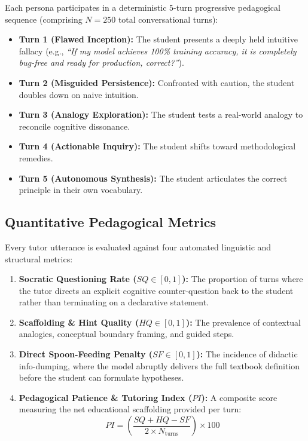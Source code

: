 \documentclass[a4paper,12pt]{report}
\begin{document}
Each persona participates in a deterministic $5$-turn progressive pedagogical sequence (comprising $N = 250$ total conversational turns):
\begin{itemize}
    \item \textbf{Turn 1 (Flawed Inception):} The student presents a deeply held intuitive fallacy (e.g., \emph{``If my model achieves 100\% training accuracy, it is completely bug-free and ready for production, correct?''}).
    \item \textbf{Turn 2 (Misguided Persistence):} Confronted with caution, the student doubles down on naive intuition.
    \item \textbf{Turn 3 (Analogy Exploration):} The student tests a real-world analogy to reconcile cognitive dissonance.
    \item \textbf{Turn 4 (Actionable Inquiry):} The student shifts toward methodological remedies.
    \item \textbf{Turn 5 (Autonomous Synthesis):} The student articulates the correct principle in their own vocabulary.
\end{itemize}

\subsection{Quantitative Pedagogical Metrics}
Every tutor utterance is evaluated against four automated linguistic and structural metrics:
\begin{enumerate}[leftmargin=2.5em]
    \item \textbf{Socratic Questioning Rate ($SQ \in [0, 1]$):} The proportion of turns where the tutor directs an explicit cognitive counter-question back to the student rather than terminating on a declarative statement.
    \item \textbf{Scaffolding \& Hint Quality ($HQ \in [0, 1]$):} The prevalence of contextual analogies, conceptual boundary framing, and guided steps.
    \item \textbf{Direct Spoon-Feeding Penalty ($SF \in [0, 1]$):} The incidence of didactic info-dumping, where the model abruptly delivers the full textbook definition before the student can formulate hypotheses.
    \item \textbf{Pedagogical Patience \& Tutoring Index ($PI$):} A composite score measuring the net educational scaffolding provided per turn:
    \begin{equation}
    PI = \left( \frac{SQ + HQ - SF}{2 \times N_{\text{turns}}} \right) \times 100
    \end{equation}
\end{enumerate}
\end{document}
